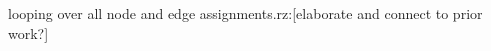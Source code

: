 \documentclass[10pt,twocolumn,letterpaper]{article}
\newcommand{\authcomment}[3]{\textcolor{#1}{#2:[#3]}}
\newcommand{\rowan}[1]{{\color{red}rz:[#1]}}
\newcommand{\sam}[1]{\authcomment{blue}{sam}{#1}}
\newcommand{\yc}[1]{{\color{purple}yc:[#1]}}
\begin{document}
looping over all node and edge assignments.\rowan{elaborate and connect to prior work?}%
\end{document}
